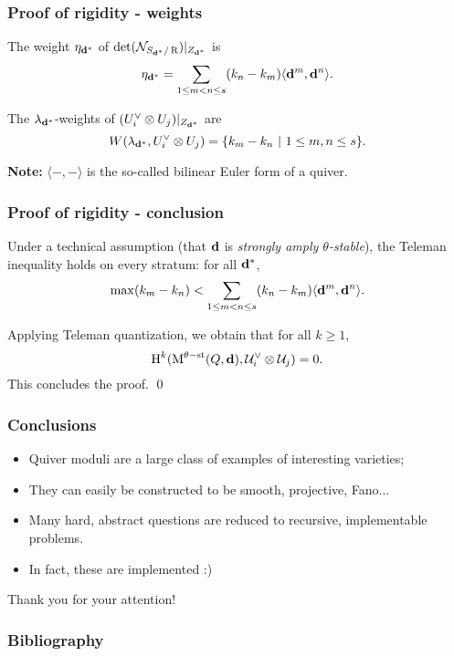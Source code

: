 \documentclass{beamer}
\begin{document}
\begin{frame}
    \frametitle{Proof of rigidity - weights}
\begin{lemma}
The weight $\eta_{\mathbf{d}^*}$ of $\det(\mathcal{N}_{S_{\mathbf{d}^*}/\operatorname{R}})|_{Z_{\mathbf{d}^*}}$ is
\[\eta_{\mathbf{d}^*} = \sum_{1 \leq m < n \leq s} (k_n - k_m)\langle \mathbf{d}^m, \mathbf{d}^n \rangle.\]
\end{lemma} \pause

\begin{lemma}
    The $\lambda_{\mathbf{d}^*}$-weights of $(U^{\vee}_i \otimes {U}_j)|_{Z_{\mathbf{d}^*}}$ are
    \[W(\lambda_{\mathbf{d}^*}, U_i^{\vee} \otimes U_j) = \{k_m - k_n ~|~ 1 \leq m, n \leq s\}.\]
\end{lemma} \pause
{\bf Note: } $\langle -,-\rangle$ is the so-called bilinear Euler form of a quiver.
\end{frame}

\begin{frame}
    \frametitle{Proof of rigidity - conclusion}
\begin{theorem}

    Under a technical assumption (that $\mathbf{d}$ is \emph{strongly amply $\theta$-stable}),
    the Teleman inequality holds on every stratum: for all $\mathbf{d}^*$,
    \[\max(k_m - k_n) < \sum_{1 \leq m < n \leq s} (k_n - k_m)\langle \mathbf{d}^m, \mathbf{d}^n \rangle.\] \pause
\end{theorem}
\begin{corollary}
    
    Applying Teleman quantization, we obtain that for all $k \geq 1$,
    \[ \operatorname{H}^k(\operatorname{M}^{\theta-\mathrm{st}}(Q, \mathbf{d}), \mathcal{U}^{\vee}_i \otimes \mathcal{U}_j) = 0. \]
    This concludes the proof. \qed \pause
\end{corollary}
\end{frame}
\begin{frame}
    \frametitle{Conclusions}
\begin{itemize}
\item Quiver moduli are a large class of examples of interesting varieties; \pause
\item They can easily be constructed to be smooth, projective, Fano... \pause 
\item Many hard, abstract questions are reduced to recursive, implementable problems. \pause
\item In fact, these are implemented :)
\end{itemize}
\end{frame}
\begin{frame}
\begin{center}
    Thank you for your attention!
\end{center}
\end{frame}

\begin{frame}
    \frametitle{Bibliography}
    \printbibliography
\end{frame}
\end{document}
